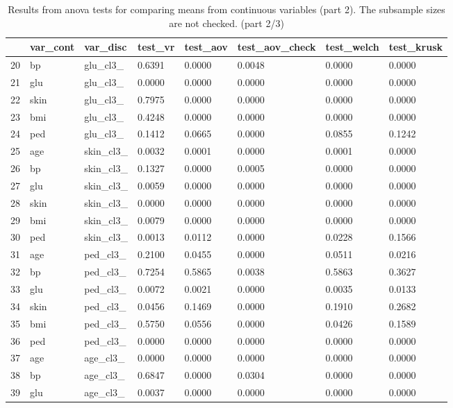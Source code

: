 \documentclass[12pt]{article}
\begin{document}
\begin{landscape}
\newpage
\begin{table}[ht]
\centering
\begin{tabular}{rlllllll}
  \hline
 & var\_cont & var\_disc & test\_vr & test\_aov & test\_aov\_check & test\_welch & test\_krusk \\ 
  \hline
20 & bp & glu\_cl3\_ & 0.6391 & 0.0000 & 0.0048 & 0.0000 & 0.0000 \\ 
  21 & glu & glu\_cl3\_ & 0.0000 & 0.0000 & 0.0000 & 0.0000 & 0.0000 \\ 
  22 & skin & glu\_cl3\_ & 0.7975 & 0.0000 & 0.0000 & 0.0000 & 0.0000 \\ 
  23 & bmi & glu\_cl3\_ & 0.4248 & 0.0000 & 0.0000 & 0.0000 & 0.0000 \\ 
  24 & ped & glu\_cl3\_ & 0.1412 & 0.0665 & 0.0000 & 0.0855 & 0.1242 \\ 
  25 & age & skin\_cl3\_ & 0.0032 & 0.0001 & 0.0000 & 0.0001 & 0.0000 \\ 
  26 & bp & skin\_cl3\_ & 0.1327 & 0.0000 & 0.0005 & 0.0000 & 0.0000 \\ 
  27 & glu & skin\_cl3\_ & 0.0059 & 0.0000 & 0.0000 & 0.0000 & 0.0000 \\ 
  28 & skin & skin\_cl3\_ & 0.0000 & 0.0000 & 0.0000 & 0.0000 & 0.0000 \\ 
  29 & bmi & skin\_cl3\_ & 0.0079 & 0.0000 & 0.0000 & 0.0000 & 0.0000 \\ 
  30 & ped & skin\_cl3\_ & 0.0013 & 0.0112 & 0.0000 & 0.0228 & 0.1566 \\ 
  31 & age & ped\_cl3\_ & 0.2100 & 0.0455 & 0.0000 & 0.0511 & 0.0216 \\ 
  32 & bp & ped\_cl3\_ & 0.7254 & 0.5865 & 0.0038 & 0.5863 & 0.3627 \\ 
  33 & glu & ped\_cl3\_ & 0.0072 & 0.0021 & 0.0000 & 0.0035 & 0.0133 \\ 
  34 & skin & ped\_cl3\_ & 0.0456 & 0.1469 & 0.0000 & 0.1910 & 0.2682 \\ 
  35 & bmi & ped\_cl3\_ & 0.5750 & 0.0556 & 0.0000 & 0.0426 & 0.1589 \\ 
  36 & ped & ped\_cl3\_ & 0.0000 & 0.0000 & 0.0000 & 0.0000 & 0.0000 \\ 
  37 & age & age\_cl3\_ & 0.0000 & 0.0000 & 0.0000 & 0.0000 & 0.0000 \\ 
  38 & bp & age\_cl3\_ & 0.6847 & 0.0000 & 0.0304 & 0.0000 & 0.0000 \\ 
  39 & glu & age\_cl3\_ & 0.0037 & 0.0000 & 0.0000 & 0.0000 & 0.0000 \\ 
   \hline
\end{tabular}
\caption{Results from anova tests for comparing means from continuous variables (part 2). The subsample sizes are not checked. (part 2/3)} 
\label{tab:anova.test2.2}
\end{table}
 

\end{landscape}
\end{document}
